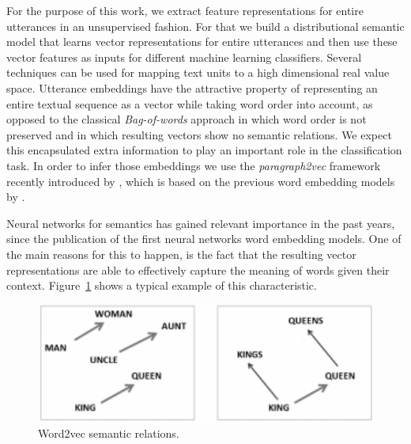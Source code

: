 For the purpose of this work, we extract feature representations for entire utterances in an unsupervised fashion.
For that we build a distributional semantic model that learns vector representations for entire utterances and then use these vector features as inputs for different machine learning classifiers.
Several techniques can be used for mapping text units to a high dimensional real value space.
Utterance embeddings have the attractive property of representing an entire textual sequence as a vector while taking word order into account, as opposed to the classical \emph{Bag-of-words} approach in which word order is not preserved and in which resulting vectors show no semantic relations.
We expect this encapsulated extra information to play an important role in the classification task. In order to infer those embeddings we use the \emph{paragraph2vec} framework recently introduced by \cite{le2014distributed}, which is based on the previous word embedding models by \cite{mikolov2013efficient}.

Neural networks for semantics has gained relevant importance in the past years, since the publication of the first neural networks word embedding models. One of the main reasons for this to happen, is the fact that the resulting vector representations are able to effectively capture the meaning of words given their context. Figure~\ref{fig:w2v_example} shows a typical example of this characteristic.

\begin{figure}
\centering
\begin{minipage}{.4\textwidth}
\includegraphics[width=1\textwidth]{img/w2v_example}
\caption{Word2vec semantic relations.}
\label{fig:w2v_example}
\end{minipage}
\end{figure}

